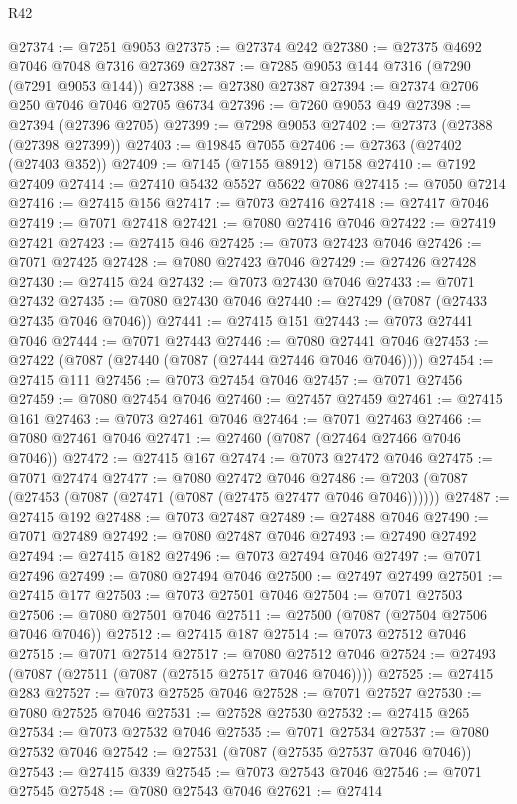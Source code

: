 \begin{lexlean}{R42}
\begin{coremodule}
{@27374 := @7251 @9053
@27375 := @27374 @242
@27380 := @27375 @4692 @7046 @7048 @7316 @27369
@27387 := @7285 @9053 @144 @7316 (@7290 (@7291 @9053 @144))
@27388 := @27380 @27387
@27394 := @27374 @2706 @250 @7046 @7046 @2705 @6734
@27396 := @7260 @9053 @49
@27398 := @27394 (@27396 @2705)
@27399 := @7298 @9053
@27402 := @27373 (@27388 (@27398 @27399))
@27403 := @19845 @7055
@27406 := @27363 (@27402 (@27403 @352))
@27409 := @7145 (@7155 @8912) @7158
@27410 := @7192 @27409
@27414 := @27410 @5432 @5527 @5622 @7086
@27415 := @7050 @7214
@27416 := @27415 @156
@27417 := @7073 @27416
@27418 := @27417 @7046
@27419 := @7071 @27418
@27421 := @7080 @27416 @7046
@27422 := @27419 @27421
@27423 := @27415 @46
@27425 := @7073 @27423 @7046
@27426 := @7071 @27425
@27428 := @7080 @27423 @7046
@27429 := @27426 @27428
@27430 := @27415 @24
@27432 := @7073 @27430 @7046
@27433 := @7071 @27432
@27435 := @7080 @27430 @7046
@27440 := @27429 (@7087 (@27433 @27435 @7046 @7046))
@27441 := @27415 @151
@27443 := @7073 @27441 @7046
@27444 := @7071 @27443
@27446 := @7080 @27441 @7046
@27453 := @27422 (@7087 (@27440 (@7087 (@27444 @27446 @7046 @7046))))
@27454 := @27415 @111
@27456 := @7073 @27454 @7046
@27457 := @7071 @27456
@27459 := @7080 @27454 @7046
@27460 := @27457 @27459
@27461 := @27415 @161
@27463 := @7073 @27461 @7046
@27464 := @7071 @27463
@27466 := @7080 @27461 @7046
@27471 := @27460 (@7087 (@27464 @27466 @7046 @7046))
@27472 := @27415 @167
@27474 := @7073 @27472 @7046
@27475 := @7071 @27474
@27477 := @7080 @27472 @7046
@27486 := @7203 (@7087 (@27453 (@7087 (@27471 (@7087 (@27475 @27477 @7046 @7046))))))
@27487 := @27415 @192
@27488 := @7073 @27487
@27489 := @27488 @7046
@27490 := @7071 @27489
@27492 := @7080 @27487 @7046
@27493 := @27490 @27492
@27494 := @27415 @182
@27496 := @7073 @27494 @7046
@27497 := @7071 @27496
@27499 := @7080 @27494 @7046
@27500 := @27497 @27499
@27501 := @27415 @177
@27503 := @7073 @27501 @7046
@27504 := @7071 @27503
@27506 := @7080 @27501 @7046
@27511 := @27500 (@7087 (@27504 @27506 @7046 @7046))
@27512 := @27415 @187
@27514 := @7073 @27512 @7046
@27515 := @7071 @27514
@27517 := @7080 @27512 @7046
@27524 := @27493 (@7087 (@27511 (@7087 (@27515 @27517 @7046 @7046))))
@27525 := @27415 @283
@27527 := @7073 @27525 @7046
@27528 := @7071 @27527
@27530 := @7080 @27525 @7046
@27531 := @27528 @27530
@27532 := @27415 @265
@27534 := @7073 @27532 @7046
@27535 := @7071 @27534
@27537 := @7080 @27532 @7046
@27542 := @27531 (@7087 (@27535 @27537 @7046 @7046))
@27543 := @27415 @339
@27545 := @7073 @27543 @7046
@27546 := @7071 @27545
@27548 := @7080 @27543 @7046
@27621 := @27414
}
\end{coremodule}
\end{lexlean}
